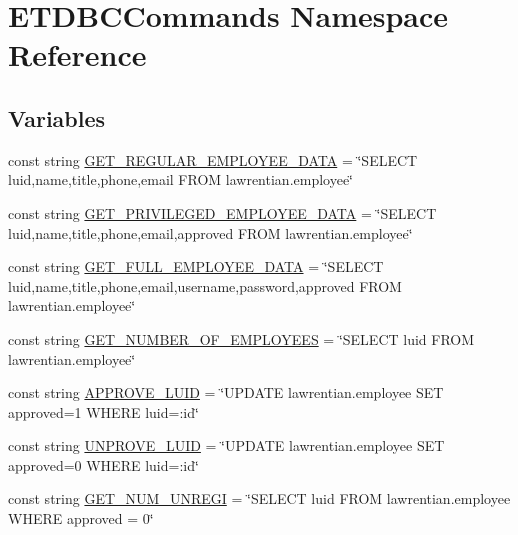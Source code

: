 \hypertarget{namespace_e_t_d_b_c_commands}{}\section{E\+T\+D\+B\+C\+Commands Namespace Reference}
\label{namespace_e_t_d_b_c_commands}
\subsection*{Variables}
\begin{DoxyCompactItemize}
\item 
const string \hyperlink{namespace_e_t_d_b_c_commands_a5d22b26a78eed8afdd2c5f89468b8a1b}{G\+E\+T\+\_\+\+R\+E\+G\+U\+L\+A\+R\+\_\+\+E\+M\+P\+L\+O\+Y\+E\+E\+\_\+\+D\+A\+T\+A} = \char`\"{}S\+E\+L\+E\+C\+T luid,name,title,phone,email F\+R\+O\+M lawrentian.\+employee\char`\"{}
\item 
const string \hyperlink{namespace_e_t_d_b_c_commands_a0d9ab08ba1207b9fd579a6af51459dfc}{G\+E\+T\+\_\+\+P\+R\+I\+V\+I\+L\+E\+G\+E\+D\+\_\+\+E\+M\+P\+L\+O\+Y\+E\+E\+\_\+\+D\+A\+T\+A} = \char`\"{}S\+E\+L\+E\+C\+T luid,name,title,phone,email,approved F\+R\+O\+M lawrentian.\+employee\char`\"{}
\item 
const string \hyperlink{namespace_e_t_d_b_c_commands_a1475584452da28fc78b2956161c57f50}{G\+E\+T\+\_\+\+F\+U\+L\+L\+\_\+\+E\+M\+P\+L\+O\+Y\+E\+E\+\_\+\+D\+A\+T\+A} = \char`\"{}S\+E\+L\+E\+C\+T luid,name,title,phone,email,username,password,approved F\+R\+O\+M lawrentian.\+employee\char`\"{}
\item 
const string \hyperlink{namespace_e_t_d_b_c_commands_ac40b08f5b0b25143fca889bf133b5ba1}{G\+E\+T\+\_\+\+N\+U\+M\+B\+E\+R\+\_\+\+O\+F\+\_\+\+E\+M\+P\+L\+O\+Y\+E\+E\+S} = \char`\"{}S\+E\+L\+E\+C\+T luid F\+R\+O\+M lawrentian.\+employee\char`\"{}
\item 
const string \hyperlink{namespace_e_t_d_b_c_commands_afb938cccd823d769aadf6b2d2f0258ce}{A\+P\+P\+R\+O\+V\+E\+\_\+\+L\+U\+I\+D} = \char`\"{}U\+P\+D\+A\+T\+E lawrentian.\+employee S\+E\+T approved=1 W\+H\+E\+R\+E luid=\+:id\char`\"{}
\item 
const string \hyperlink{namespace_e_t_d_b_c_commands_a0f9fcebb6f4bed5812550e62f6f009db}{U\+N\+P\+R\+O\+V\+E\+\_\+\+L\+U\+I\+D} = \char`\"{}U\+P\+D\+A\+T\+E lawrentian.\+employee S\+E\+T approved=0 W\+H\+E\+R\+E luid=\+:id\char`\"{}
\item 
const string \hyperlink{namespace_e_t_d_b_c_commands_a8145a815e9ebf0893a962b329e00334a}{G\+E\+T\+\_\+\+N\+U\+M\+\_\+\+U\+N\+R\+E\+G\+I} = \char`\"{}S\+E\+L\+E\+C\+T luid F\+R\+O\+M lawrentian.\+employee W\+H\+E\+R\+E approved = 0\char`\"{}
\end{DoxyCompactItemize}



